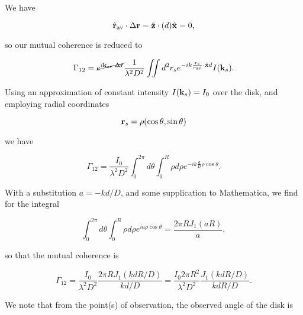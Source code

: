 {

We have

\begin{equation}\label{eqn:modernOptics:ProblemSet2:P3:170}
\hat{\mathbf{r}}_{\mathrm{av}} \cdot \Delta \mathbf{r}
= \hat{\mathbf{z}} \cdot (d) \hat{\mathbf{x}}
= 0,
\end{equation}

so our mutual coherence is reduced to

\begin{equation}\label{eqn:modernOptics:ProblemSet2:P3:190}
\Gamma_{12} 
= 
\cancel{ e^{ i \mathbf{k}_{\mathrm{av}} \cdot \Delta \mathbf{r}} }
\frac{1}{ \lambda^2 D^2 }
\iint d^2 r_s e^{-i k \frac{\mathbf{r}_s}{r_{\mathrm{av}}} \cdot \hat{\mathbf{x}} d } I( \mathbf{k}_s ).
\end{equation}

Using an approximation of constant intensity $I(\mathbf{k}_s) = I_0$ over the disk, and employing radial coordinates

\begin{equation}\label{eqn:modernOptics:ProblemSet2:P3:210}
\mathbf{r}_s = \rho (\cos\theta, \sin\theta)
\end{equation}

we have

\begin{equation}\label{eqn:modernOptics:ProblemSet2:P3:230}
\Gamma_{12} 
= 
\frac{I_0}{ \lambda^2 D^2 }
\int_0^{2 \pi} d\theta 
\int_0^R \rho d\rho
e^{-i k \frac{d}{D} \rho \cos\theta }.
\end{equation}

With a substitution $a = -k d/D$, and some supplication to Mathematica, we find for the integral 

\begin{equation}\label{eqn:modernOptics:ProblemSet2:P3:250}
\int_0^{2 \pi} d\theta 
\int_0^R \rho d\rho
e^{i a \rho \cos\theta }
=
\frac{2 \pi R J_1(a R)}{a},
\end{equation}

so that the mutual coherence is

\begin{equation}\label{eqn:modernOptics:ProblemSet2:P3:270}
\Gamma_{12} 
= 
\frac{I_0}{ \lambda^2 D^2 }
\frac{2 \pi R J_1(k d R/D)}{ k d /D }
= 
\frac{I_0 2 \pi R^2 }{ \lambda^2 D^2 }
\frac{J_1(k d R/D)}{ k d R /D }.
\end{equation}

We note that from the point(s) of observation, the observed angle of the disk is

}
